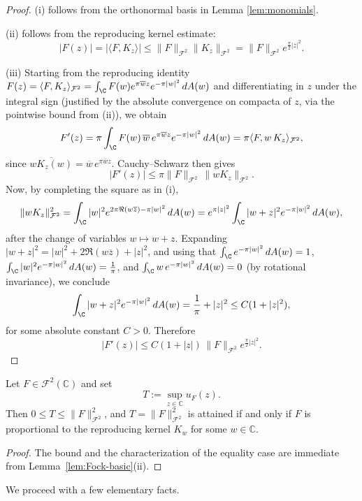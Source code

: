 \begin{proof}
(i) follows from the orthonormal basis in Lemma \ref{lem:monomials}.

(ii) follows from the reproducing kernel estimate:
\[
|F(z)| = |\langle F, K_z \rangle|
\le \|F\|_{\mathcal{F}^2} \|K_z\|_{\mathcal{F}^2}
= \|F\|_{\mathcal{F}^2} e^{\frac{\pi}{2}|z|^2}.
\]

(iii) Starting from the reproducing identity
\(F(z)=\langle F,K_z\rangle_{\mathcal F^2}=\int_{\C}F(w)e^{\pi \overline{w}z}
e^{-\pi |w|^2}\,dA(w)\) and differentiating in \(z\) under the integral sign
(justified by the absolute convergence on compacta of \(z\), via the pointwise
bound from (ii)), we obtain
\[
F'(z)=\pi \int_{\C}F(w)\,\overline{w}\,e^{\pi\overline{w}z}e^{-\pi |w|^2}\,dA(w)
=\pi \langle F, w\,K_z\rangle_{\mathcal F^2},
\]
since \(\overline{wK_z(w)}=\overline{w}\,e^{\pi\overline{w}z}\). Cauchy--Schwarz
then gives
\[
|F'(z)|
\le
\pi \|F\|_{\mathcal F^2}\,\|wK_z\|_{\mathcal F^2}.
\]
Now, by completing the square as in (i),
\[
\|wK_z\|_{\mathcal F^2}^2
=
\int_{\C} |w|^2 e^{2\pi\Re(w\overline z)-\pi |w|^2}\,dA(w)
=
e^{\pi |z|^2}\int_{\C} |w+z|^2 e^{-\pi |w|^2}\,dA(w),
\]
after the change of variables \(w\mapsto w+z\). Expanding
\(|w+z|^2=|w|^2+2\Re(w\overline z)+|z|^2\), and using that
\(\int_\C e^{-\pi |w|^2}\,dA(w)=1\),
\(\int_\C |w|^2 e^{-\pi |w|^2}\,dA(w)=\frac{1}{\pi}\), and
\(\int_\C w\,e^{-\pi |w|^2}\,dA(w)=0\) (by rotational invariance), we conclude
\[
\int_{\C} |w+z|^2 e^{-\pi |w|^2}\,dA(w)
=
\frac{1}{\pi}+|z|^2
\le
C(1+|z|^2),
\]
for some absolute constant \(C>0\). Therefore
\[
|F'(z)| \le C(1+|z|)\,\|F\|_{\mathcal F^2}e^{\frac{\pi}{2}|z|^2}.
\]
\end{proof}

\medskip

\begin{lemma}\label{lem:max}
Let $F \in \mathcal{F}^2(\mathbb{C})$ and set
\[
T := \sup_{z \in \mathbb{C}} u_F(z).
\]
Then $0 \le T \le \|F\|_{\mathcal{F}^2}^2$, and $T = \|F\|_{\mathcal{F}^2}^2$
is attained if and only if $F$ is proportional to the reproducing kernel $K_w$
for some $w \in \mathbb{C}$.
\end{lemma}

\begin{proof}
The bound and the characterization of the equality case are immediate from
Lemma~\ref{lem:Fock-basic}(ii).
    \end{proof}

\medskip

    We proceed with a few elementary facts.

